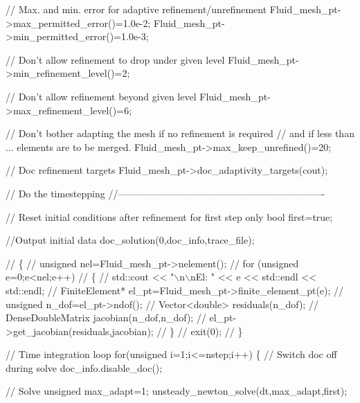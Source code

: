\begin{DoxyCodeInclude}
{ \textcolor{comment}{// Max. and min. error for adaptive refinement/unrefinement}
 Fluid\_mesh\_pt->max\_permitted\_error()=1.0e-2; 
 Fluid\_mesh\_pt->min\_permitted\_error()=1.0e-3; 

 \textcolor{comment}{// Don't allow refinement to drop under given level}
 Fluid\_mesh\_pt->min\_refinement\_level()=2;

 \textcolor{comment}{// Don't allow refinement beyond given level }
 Fluid\_mesh\_pt->max\_refinement\_level()=6; 

 \textcolor{comment}{// Don't bother adapting the mesh if no refinement is required}
 \textcolor{comment}{// and if less than ... elements are to be merged.}
 Fluid\_mesh\_pt->max\_keep\_unrefined()=20;

 \textcolor{comment}{// Doc refinement targets}
 Fluid\_mesh\_pt->doc\_adaptivity\_targets(cout);


 \textcolor{comment}{// Do the timestepping}
 \textcolor{comment}{//----------------------------------------------------------------}

 \textcolor{comment}{// Reset initial conditions after refinement for first step only}
 \textcolor{keywordtype}{bool} first=\textcolor{keyword}{true};

 \textcolor{comment}{//Output initial data}
 doc\_solution(0,doc\_info,trace\_file);


\textcolor{comment}{//  \{}
\textcolor{comment}{//   unsigned nel=Fluid\_mesh\_pt->nelement();}
\textcolor{comment}{//   for (unsigned e=0;e<nel;e++)}
\textcolor{comment}{//    \{}
\textcolor{comment}{//     std::cout << "\(\backslash\)n\(\backslash\)nEl: " << e << std::endl << std::endl; }
\textcolor{comment}{//     FiniteElement* el\_pt=Fluid\_mesh\_pt->finite\_element\_pt(e);}
\textcolor{comment}{//     unsigned n\_dof=el\_pt->ndof();}
\textcolor{comment}{//     Vector<double> residuals(n\_dof);}
\textcolor{comment}{//     DenseDoubleMatrix jacobian(n\_dof,n\_dof);}
\textcolor{comment}{//     el\_pt->get\_jacobian(residuals,jacobian);}
\textcolor{comment}{//    \}}
\textcolor{comment}{//   exit(0);}
\textcolor{comment}{//  \}}

 \textcolor{comment}{// Time integration loop}
 \textcolor{keywordflow}{for}(\textcolor{keywordtype}{unsigned} i=1;i<=nstep;i++)
  \{
   \textcolor{comment}{// Switch doc off during solve}
   doc\_info.disable\_doc();

   \textcolor{comment}{// Solve}
   \textcolor{keywordtype}{unsigned} max\_adapt=1; 
   unsteady\_newton\_solve(dt,max\_adapt,first);

}
\end{DoxyCodeInclude}
